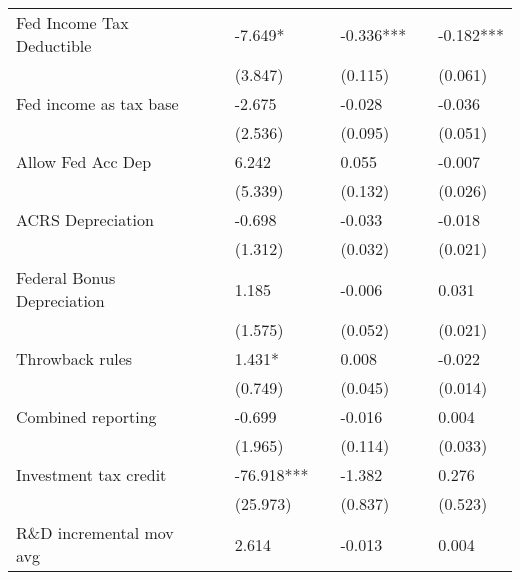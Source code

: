 {\begin{tabular}{l*{6}{l}}
Fed Income Tax Deductible&               &      -7.649*  &               &      -0.336***&               &      -0.182***\\
                    &               &     (3.847)   &               &     (0.115)   &               &     (0.061)   \\
Fed income as tax base&               &      -2.675   &               &      -0.028   &               &      -0.036   \\
                    &               &     (2.536)   &               &     (0.095)   &               &     (0.051)   \\
Allow Fed Acc Dep   &               &       6.242   &               &       0.055   &               &      -0.007   \\
                    &               &     (5.339)   &               &     (0.132)   &               &     (0.026)   \\
ACRS Depreciation   &               &      -0.698   &               &      -0.033   &               &      -0.018   \\
                    &               &     (1.312)   &               &     (0.032)   &               &     (0.021)   \\
Federal Bonus Depreciation&               &       1.185   &               &      -0.006   &               &       0.031   \\
                    &               &     (1.575)   &               &     (0.052)   &               &     (0.021)   \\
Throwback rules     &               &       1.431*  &               &       0.008   &               &      -0.022   \\
                    &               &     (0.749)   &               &     (0.045)   &               &     (0.014)   \\
Combined reporting  &               &      -0.699   &               &      -0.016   &               &       0.004   \\
                    &               &     (1.965)   &               &     (0.114)   &               &     (0.033)   \\
Investment tax credit&               &     -76.918***&               &      -1.382   &               &       0.276   \\
                    &               &    (25.973)   &               &     (0.837)   &               &     (0.523)   \\
R\&D incremental mov avg&               &       2.614   &               &      -0.013   &               &       0.004   \\

\end{tabular}}
